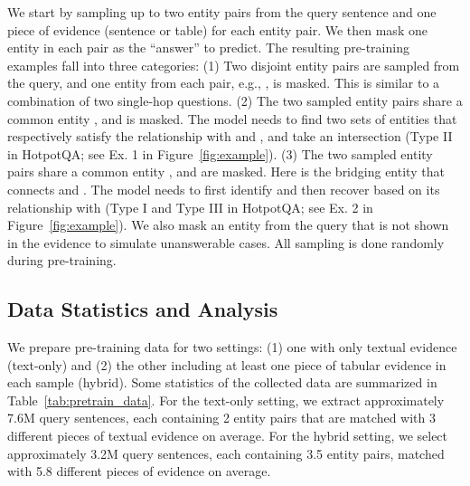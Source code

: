 \documentclass[11pt]{article}
\newcommand{\add}[1]{\textcolor{red}{#1}}
\newcommand{\revise}[1]{#1}
\newcommand{\nop}[1]{}
\begin{document}
We start by sampling up to two entity pairs from the query sentence and one piece of evidence\nop{sample} (sentence or table) for each entity pair. We then mask one entity in each pair as the ``answer'' to predict. {The resulting pre-training examples fall into three categories: (1) Two disjoint entity pairs  are sampled from the query, and one entity from each pair, e.g., , is masked. This is similar to a combination of two single-hop questions. (2) The two sampled entity pairs  share a common entity , and  is masked. The model needs to find two sets of entities that respectively satisfy the relationship with  and , and take an intersection (Type II in HotpotQA; see Ex. 1 in Figure~\ref{fig:example}). (3) The two sampled entity pairs  share a common entity , and  are masked. Here  is the bridging entity that connects  and . The model needs to first identify  and then recover  based on its relationship with  (Type I and Type III in HotpotQA; see Ex. 2 in Figure~\ref{fig:example}).}\nop{Note that the selected entity pairs may contain overlapping entities, so the same entity may be selected as the ``answer'', or both entities in a pair may be masked. This naturally imitates different reasoning types in multi-hop QA, like finding the answer that satisfies multiple constraints {\add{(masking the same entity, see the second example in Figure 1)}}, or finding the answer through a bridging entity {\add{(masking both entities in a pair, see the third example in Figure 1)}}.} We also mask an entity from the query that is not shown in the evidence to simulate unanswerable cases. All sampling is done randomly during pre-training. \nop{just confirm that we don't first prepare the data `before' pre-training, right? Yes} \nop{I think this subsection needs to be significantly expanded. It's where \textit{reasoning} comes from and the design is not very intuitive. For example, it's probably not immediately clear to most audience why you'd need to select two entity pairs. You keep saying ``mimicking different reasoning types'', and this should be the place to elaborate on that.}

\subsection{Data Statistics and Analysis}
\revise{We prepare pre-training data for two settings: (1) one with only textual evidence (text-only) and (2) the other including at least one piece of tabular evidence in each sample (hybrid). Some statistics of the collected data are summarized in Table~\ref{tab:pretrain_data}. For the text-only setting, we extract approximately 7.6M query sentences, each containing 2 entity pairs that are matched with 3 different pieces of textual evidence on average.\nop{how many training instances do we have for each setting? 7.6M * 3?, the unique combinations should be more than that, but we consider going over all 7.6M queries as 1 epoch.} For the hybrid setting, we select approximately 3.2M query sentences, each containing 3.5 entity pairs, matched with 5.8 different pieces of evidence on average.}  \nop{we will have 2 pre-trained models respectively for the 2 settings, right?}
\end{document}
